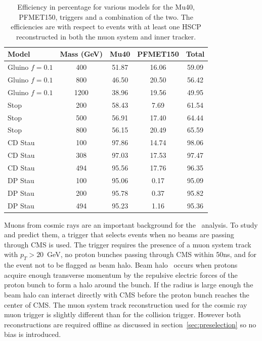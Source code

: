 \begin{table}
 \begin{center}
      \caption[Trigger efficiency for various models considered with respect to events with a reconstructed HSCP in both the muon system and inner tracker]
	      {Efficiency in percentage for various models for the Mu40, PFMET150, triggers and a combination of the two.
The efficiencies are with respect to events with at least one HSCP reconstructed in both the muon system and inner tracker.}
     \label{tab:triggEffGl}
  \begin{tabular}{|l|c|c|c|c|} \hline
      Model     & Mass (GeV) & Mu40       & PFMET150   & Total                 \\ \hline
 Gluino $f=0.1$ &  400       & 51.87      & 16.06      & 59.09    \\
 Gluino $f=0.1$ &  800       & 46.50      & 20.50      & 56.42    \\
 Gluino $f=0.1$ & 1200       & 38.96      & 19.56      & 49.95    \\
           Stop &  200       & 58.43      &  7.69      & 61.54    \\
           Stop &  500       & 56.91      & 17.40      & 64.44    \\
           Stop &  800       & 56.15      & 20.49      & 65.59    \\
        CD Stau &  100       & 97.86      & 14.74      & 98.06    \\
        CD Stau &  308       & 97.03      & 17.53      & 97.47    \\
        CD Stau &  494       & 95.56      & 17.76      & 96.35    \\
        DP Stau &  100       & 95.06      &  0.17      & 95.09    \\
        DP Stau &  200       & 95.78      &  0.37      & 95.82    \\
        DP Stau &  494       & 95.23      &  1.16      & 95.36    \\ \hline
  \end{tabular}
 \end{center}
\end{table}

Muons from cosmic rays are an important background for the \muononly\ analysis. To study and predict them, a trigger that selects events when no beams are passing through
CMS is used. The trigger requires the presence of a muon system track with $p_T > 20$~GeV, no proton bunches passing through CMS within 50ns,
and for the event not to be flagged as beam halo. Beam halo~\cite{wangler2000beam} occurs when protons acquire enough transverse momentum by the repulsive electric forces
of the proton bunch to form a halo around the bunch. If the radius is large enough the beam halo can interact directly with CMS before the 
proton bunch reaches the center of CMS.
The muon system track reconstruction used for the cosmic ray muon trigger is slightly different than for the collision trigger.
However both reconstructions are required offline as discussed in section~\ref{sec:preselection} so no bias is introduced.

